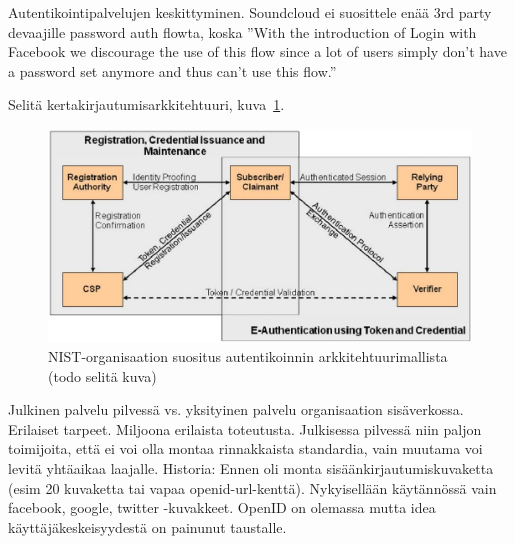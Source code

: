 \documentclass[finnish,gradu]{tktltiki}
\begin{document}
  Autentikointipalvelujen keskittyminen. Soundcloud ei suosittele enää 3rd party devaajille password auth flowta, koska ''With the introduction of Login with Facebook we discourage the use of this flow since a lot of users simply don't have a password set anymore and thus can't use this flow.''


  Selitä kertakirjautumisarkkitehtuuri, kuva~\ref{fig:kertakirjautumisarkkitehtuurin_yleiskuva}.
  \begin{figure}
    \centering
    \includegraphics[width=1.0\textwidth]{images/NIST_authentication_architectural_model.jpg}
    \caption{NIST-organisaation suositus autentikoinnin arkkitehtuurimallista \cite{NIST_SP800-63-1} (todo selitä kuva) }
    \label{fig:kertakirjautumisarkkitehtuurin_yleiskuva}
  \end{figure}











  Julkinen palvelu pilvessä vs. yksityinen palvelu organisaation sisäverkossa. Erilaiset tarpeet. Miljoona erilaista toteutusta. Julkisessa pilvessä niin paljon toimijoita, että ei voi olla montaa rinnakkaista standardia, vain muutama voi levitä yhtäaikaa laajalle. Historia: Ennen oli monta sisäänkirjautumiskuvaketta (esim 20 kuvaketta tai vapaa openid-url-kenttä). Nykyisellään käytännössä vain facebook, google, twitter -kuvakkeet. OpenID on olemassa mutta idea käyttäjäkeskeisyydestä on painunut taustalle.
\end{document}
